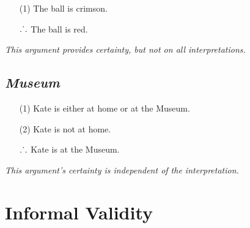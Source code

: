 \documentclass[a4paper, 11pt]{article} %
\def\therefore{\ensuremath{\ldotp\dot{}\,\ldotp}}
\begin{document}
\begin{enumerate}
  \item[(1)] The ball is crimson.
  \item[\therefore] The ball is red.
\end{enumerate}

\noindent
\textit{This argument provides certainty, but not on all interpretations.}

\subsection*{\it \textbf{Museum}}

\begin{enumerate}
  \item[(1)] Kate is either at home or at the Museum.
  \item[(2)] Kate is not at home.
  \item[\therefore] Kate is at the Museum.
\end{enumerate}

\noindent
\textit{This argument's certainty is independent of the interpretation.}


\section*{Informal Validity}
\end{document}
